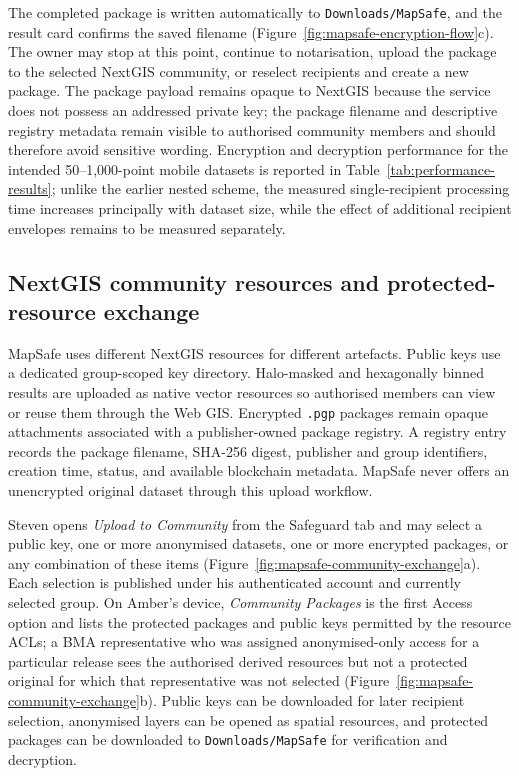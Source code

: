 \documentclass[a4paper,UKenglish,cleveref,autoref,thm-restate]{lipics-v2021}
\begin{document}
The completed package is written automatically to \texttt{Downloads/MapSafe}, and the result card confirms the saved filename (Figure~\ref{fig:mapsafe-encryption-flow}c). The owner may stop at this point, continue to notarisation, upload the package to the selected NextGIS community, or reselect recipients and create a new package. The package payload remains opaque to NextGIS because the service does not possess an addressed private key; the package filename and descriptive registry metadata remain visible to authorised community members and should therefore avoid sensitive wording. Encryption and decryption performance for the intended 50--1,000-point mobile datasets is reported in Table~\ref{tab:performance-results}; unlike the earlier nested scheme, the measured single-recipient processing time increases principally with dataset size, while the effect of additional recipient envelopes remains to be measured separately.

\FloatBarrier
\subsection{NextGIS community resources and protected-resource exchange}
\label{sec:community-packages}

MapSafe uses different NextGIS resources for different artefacts. Public keys use a dedicated group-scoped key directory. Halo-masked and hexagonally binned results are uploaded as native vector resources so authorised members can view or reuse them through the Web GIS. Encrypted \texttt{.pgp} packages remain opaque attachments associated with a publisher-owned package registry. A registry entry records the package filename, SHA-256 digest, publisher and group identifiers, creation time, status, and available blockchain metadata. MapSafe never offers an unencrypted original dataset through this upload workflow.

Steven opens \emph{Upload to Community} from the Safeguard tab and may select a public key, one or more anonymised datasets, one or more encrypted packages, or any combination of these items (Figure~\ref{fig:mapsafe-community-exchange}a). Each selection is published under his authenticated account and currently selected group. On Amber's device, \emph{Community Packages} is the first Access option and lists the protected packages and public keys permitted by the resource ACLs; a BMA representative who was assigned anonymised-only access for a particular release sees the authorised derived resources but not a protected original for which that representative was not selected (Figure~\ref{fig:mapsafe-community-exchange}b). Public keys can be downloaded for later recipient selection, anonymised layers can be opened as spatial resources, and protected packages can be downloaded to \texttt{Downloads/MapSafe} for verification and decryption.
\end{document}
